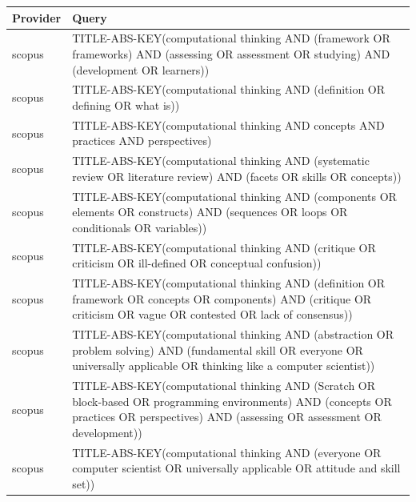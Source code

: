 \documentclass{article}
\begin{document}
\begin{longtable}{lp{10cm}}
\toprule
Provider & Query \\
\midrule
scopus & TITLE-ABS-KEY(\textquotedbl{}computational thinking\textquotedbl{} AND (framework OR frameworks) AND (assessing OR assessment OR studying) AND (development OR learners)) \\
scopus & TITLE-ABS-KEY(\textquotedbl{}computational thinking\textquotedbl{} AND (definition OR defining OR \textquotedbl{}what is\textquotedbl{})) \\
scopus & TITLE-ABS-KEY(\textquotedbl{}computational thinking\textquotedbl{} AND concepts AND practices AND perspectives) \\
scopus & TITLE-ABS-KEY(\textquotedbl{}computational thinking\textquotedbl{} AND (\textquotedbl{}systematic review\textquotedbl{} OR \textquotedbl{}literature review\textquotedbl{}) AND (facets OR skills OR concepts)) \\
scopus & TITLE-ABS-KEY(\textquotedbl{}computational thinking\textquotedbl{} AND (components OR elements OR constructs) AND (sequences OR loops OR conditionals OR variables)) \\
scopus & TITLE-ABS-KEY(\textquotedbl{}computational thinking\textquotedbl{} AND (critique OR criticism OR \textquotedbl{}ill-defined\textquotedbl{} OR \textquotedbl{}conceptual confusion\textquotedbl{})) \\
scopus & TITLE-ABS-KEY(\textquotedbl{}computational thinking\textquotedbl{} AND (definition OR framework OR concepts OR components) AND (critique OR criticism OR vague OR contested OR \textquotedbl{}lack of consensus\textquotedbl{})) \\
scopus & TITLE-ABS-KEY(\textquotedbl{}computational thinking\textquotedbl{} AND (abstraction OR \textquotedbl{}problem solving\textquotedbl{}) AND (\textquotedbl{}fundamental skill\textquotedbl{} OR everyone OR \textquotedbl{}universally applicable\textquotedbl{} OR \textquotedbl{}thinking like a computer scientist\textquotedbl{})) \\
scopus & TITLE-ABS-KEY(\textquotedbl{}computational thinking\textquotedbl{} AND (Scratch OR \textquotedbl{}block-based\textquotedbl{} OR \textquotedbl{}programming environments\textquotedbl{}) AND (concepts OR practices OR perspectives) AND (assessing OR assessment OR development)) \\
scopus & TITLE-ABS-KEY(\textquotedbl{}computational thinking\textquotedbl{} AND (everyone OR \textquotedbl{}computer scientist\textquotedbl{} OR \textquotedbl{}universally applicable\textquotedbl{} OR \textquotedbl{}attitude and skill set\textquotedbl{})) \\

\end{longtable}
\end{document}
